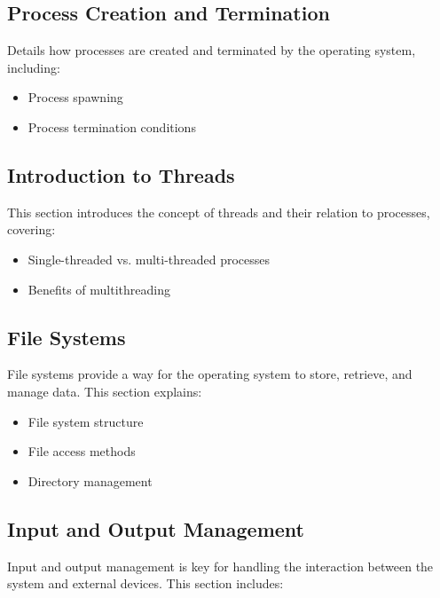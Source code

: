 \documentclass[12pt]{article}
\begin{document}
\subsection{Process Creation and Termination}
Details how processes are created and terminated by the operating system, including:
\begin{itemize}
    \item Process spawning
    \item Process termination conditions
\end{itemize}

\subsection{Introduction to Threads}
This section introduces the concept of threads and their relation to processes, covering:
\begin{itemize}
    \item Single-threaded vs. multi-threaded processes
    \item Benefits of multithreading
\end{itemize}



\subsection{File Systems}
File systems provide a way for the operating system to store, retrieve, and manage data. This section explains:
\begin{itemize}
    \item File system structure
    \item File access methods
    \item Directory management
\end{itemize}

\subsection{Input and Output Management}
Input and output management is key for handling the interaction between the system and external devices. This section includes:
\end{document}
